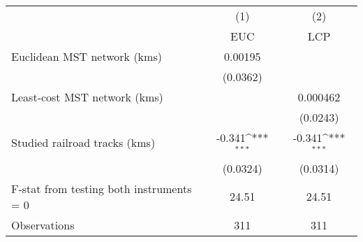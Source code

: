 {
\def\sym#1{\ifmmode^{#1}\else\(^{#1}\)\fi}
\begin{tabular}{l*{2}{c}}
\hline\hline
                &\multicolumn{1}{c}{(1)}&\multicolumn{1}{c}{(2)}\\
                &\multicolumn{1}{c}{EUC}&\multicolumn{1}{c}{LCP}\\
\hline
Euclidean MST network (kms)&  0.00195         &                  \\
                & (0.0362)         &                  \\
[1em]
Least-cost MST network (kms)&                  & 0.000462         \\
                &                  & (0.0243)         \\
[1em]
Studied railroad tracks (kms)&   -0.341\sym{***}&   -0.341\sym{***}\\
                & (0.0324)         & (0.0314)         \\
\hline
F-stat from testing both instruments = 0&    24.51         &    24.51         \\
Observations    &      311         &      311         \\
\hline\hline
\end{tabular}
}
